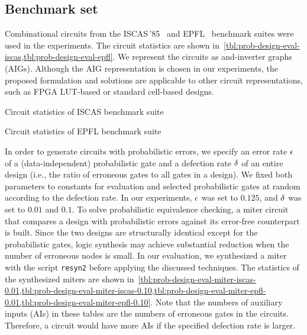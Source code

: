 \subsection{Benchmark set}
Combinational circuits from the ISCAS\,'85~\cite{ISCAS85-benchmark}
and EPFL~\cite{EPFL-benchmark} benchmark suites were used in the experiments.
The circuit statistics are shown in~\cref{tbl:prob-design-eval-iscas,tbl:prob-design-eval-epfl}.
We represent the circuits as and-inverter graphs (AIGs).
Although the AIG representation is chosen in our experiments,
the proposed formulation and solutions are applicable to other circuit representations,
such as FPGA LUT-based or standard cell-based designs.

\begin{table}[ht]
    \centering
    \scriptsize
    \caption{Circuit statistics of ISCAS benchmark suite}
    \label{tbl:prob-design-eval-iscas}
\end{table}

\begin{table}[hp]
    \centering
    \scriptsize
    \caption{Circuit statistics of EPFL benchmark suite}
    \label{tbl:prob-design-eval-epfl}
\end{table}

In order to generate circuits with probabilistic errors,
we specify an error rate $\epsilon$ of a (data-independent) probabilistic gate and
a defection rate $\delta$ of an entire design (i.e., the ratio of erroneous gates to all gates in a design).
We fixed both parameters to constants for evaluation
and selected probabilistic gates at random according to the defection rate.
In our experiments, $\epsilon$ was set to $0.125$, and $\delta$ was set to $0.01$ and $0.1$.
To solve probabilistic equivalence checking,
a miter circuit that compares a design with probabilistic errors against its error-free counterpart is built.
Since the two designs are structurally identical except for the probabilistic gates,
logic synthesis may achieve substantial reduction when the number of erroneous nodes is small.
In our evaluation, we synthesized a miter with the script \texttt{resyn2} before applying the discussed techniques.
The statistics of the synthesized miters are shown in~\cref{tbl:prob-design-eval-miter-iscas-0.01,tbl:prob-design-eval-miter-iscas-0.10,tbl:prob-design-eval-miter-epfl-0.01,tbl:prob-design-eval-miter-epfl-0.10}.
Note that the numbers of auxiliary inputs (AIs) in these tables are the numbers of erroneous gates in the circuits.
Therefore, a circuit would have more AIs if the specified defection rate is larger.

